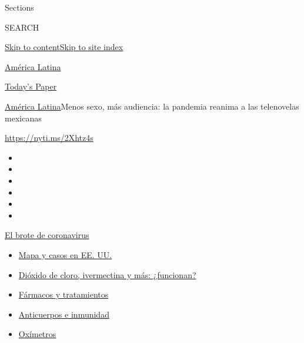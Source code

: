 Sections

SEARCH

\protect\hyperlink{site-content}{Skip to
content}\protect\hyperlink{site-index}{Skip to site index}

\href{https://www.nytimes3xbfgragh.onion/es/section/america-latina}{América
Latina}

\href{https://myaccount.nytimes3xbfgragh.onion/auth/login?response_type=cookie\&client_id=vi}{}

\href{https://www.nytimes3xbfgragh.onion/section/todayspaper}{Today's
Paper}

\href{/es/section/america-latina}{América Latina}\textbar{}Menos sexo,
más audiencia: la pandemia reanima a las telenovelas mexicanas

\url{https://nyti.ms/2Xhtz4s}

\begin{itemize}
\item
\item
\item
\item
\item
\item
\end{itemize}

\href{https://www.nytimes3xbfgragh.onion/es/spotlight/coronavirus?action=click\&pgtype=Article\&state=default\&region=TOP_BANNER\&context=storylines_menu}{El
brote de coronavirus}

\begin{itemize}
\tightlist
\item
  \href{https://www.nytimes3xbfgragh.onion/es/interactive/2020/espanol/mundo/coronavirus-en-estados-unidos.html?action=click\&pgtype=Article\&state=default\&region=TOP_BANNER\&context=storylines_menu}{Mapa
  y casos en EE. UU.}
\item
  \href{https://www.nytimes3xbfgragh.onion/es/2020/07/23/espanol/america-latina/bolivia-cloro-coronavirus-ivermectina.html?action=click\&pgtype=Article\&state=default\&region=TOP_BANNER\&context=storylines_menu}{Dióxido
  de cloro, ivermectina y más: ¿funcionan?}
\item
  \href{https://www.nytimes3xbfgragh.onion/es/interactive/2020/science/coronavirus-tratamientos-curas.html?action=click\&pgtype=Article\&state=default\&region=TOP_BANNER\&context=storylines_menu}{Fármacos
  y tratamientos}
\item
  \href{https://www.nytimes3xbfgragh.onion/es/2020/07/28/espanol/ciencia-y-tecnologia/anticuerpos-coronavirus-inmunidad.html?action=click\&pgtype=Article\&state=default\&region=TOP_BANNER\&context=storylines_menu}{Anticuerpos
  e inmunidad}
\item
  \href{https://www.nytimes3xbfgragh.onion/es/2020/04/29/espanol/estilos-de-vida/oximetro-para-que-sirve.html?action=click\&pgtype=Article\&state=default\&region=TOP_BANNER\&context=storylines_menu}{Oxímetros}
\end{itemize}

